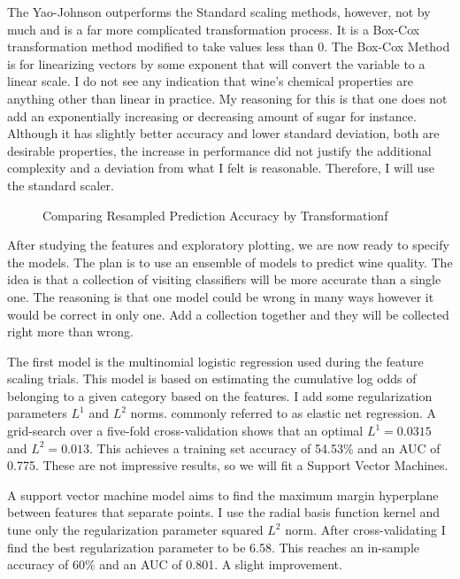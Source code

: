 \documentclass[16pt,twocolumn,letterpaper,titlepage]{article}
\begin{document}
The Yao-Johnson outperforms the Standard scaling methods, however, not by much and is a far more complicated transformation process. It is a Box-Cox transformation method modified to take values less than 0. The Box-Cox Method is for linearizing vectors by some exponent that will convert the variable to a linear scale. I do not see any indication that wine's chemical properties are anything other than linear in practice. My reasoning for this is that one does not add an exponentially increasing or decreasing amount of sugar for instance. Although it has slightly better accuracy and lower standard deviation, both are desirable properties, the increase in performance did not justify the additional complexity and a deviation from what I felt is reasonable. Therefore, I will use the standard scaler.

\begin{figure}[!htb]
	\caption{\label{fig:my-label} Comparing Resampled Prediction Accuracy by Transformationf}
\end{figure}
 
After studying the features and exploratory plotting, we are now ready to specify the models. The plan is to use an ensemble of models to predict wine quality. The idea is that a collection of visiting classifiers will be more accurate than a single one. The reasoning is that one model could be wrong in many ways however it would be correct in only one. Add a collection together and they will be collected right more than wrong.


The first model is the multinomial logistic regression used during the feature scaling trials. This model is based on estimating the cumulative log odds of belonging to a given category based on the features. I add some regularization parameters $L^1$ and $L^2$ norms. commonly referred to as elastic net regression. A grid-search over a five-fold cross-validation shows that an optimal $L^1 = 0.0315$ and $L^2 = 0.013$. This achieves a training set accuracy of 54.53\% and an AUC of 0.775. These are not impressive results, so we will fit a Support Vector Machines. 

A support vector machine model aims to find the maximum margin hyperplane between features that separate points. I use the radial basis function kernel and tune only the regularization parameter squared $L^2$ norm. After cross-validating I find the best regularization parameter to be 6.58. This reaches an in-sample accuracy of 60\% and an AUC of 0.801. A slight improvement. 
\end{document}

